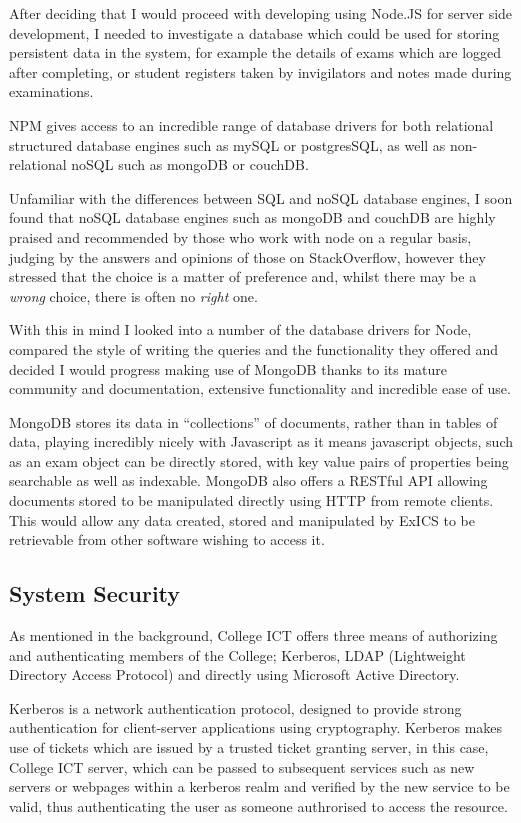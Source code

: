 After deciding that I would proceed with developing using Node.JS for server side development, I needed to investigate a database which could be used for storing persistent data in the system, for example the details of exams which are logged after completing, or student registers taken by invigilators and notes made during examinations.

NPM gives access to an incredible range of database drivers for both relational structured database engines such as mySQL or postgresSQL, as well as non-relational noSQL such as mongoDB or couchDB.

Unfamiliar with the differences between SQL and noSQL database engines, I soon found that noSQL database engines such as mongoDB and couchDB are highly praised and recommended by those who work with node on a regular basis, judging by the answers and opinions of those on StackOverflow, however they stressed that the choice is a matter of preference and, whilst there may be a \textit{wrong} choice, there is often no \textit{right} one.\cite{databaseChoice}

With this in mind I looked into a number of the database drivers for Node, compared the style of writing the queries and the functionality they offered and decided I would progress making use of MongoDB thanks to its mature community and documentation, extensive functionality and incredible ease of use.

MongoDB stores its data in ``collections'' of documents, rather than in tables of data, playing incredibly nicely with Javascript as it means javascript objects, such as an exam object can be directly stored, with key value pairs of properties being searchable as well as indexable.  MongoDB also offers a RESTful API allowing documents stored to be manipulated directly using HTTP from remote clients.  This would allow any data created, stored and manipulated by ExICS to be retrievable from other software wishing to access it.

\subsection{System Security}

As mentioned in the background, College ICT offers three means of authorizing and authenticating members of the College; Kerberos, LDAP (Lightweight Directory Access Protocol) and directly using Microsoft Active Directory.

Kerberos is a network authentication protocol, designed to provide strong authentication for client-server applications using cryptography.\cite{whatiskerberos}  Kerberos makes use of tickets which are issued by a trusted ticket granting server, in this case, College ICT server, which can be passed to subsequent services such as new servers or webpages within a kerberos realm and verified by the new service to be valid, thus authenticating the user as someone authrorised to access the resource.\cite{explainlikeIm5}

